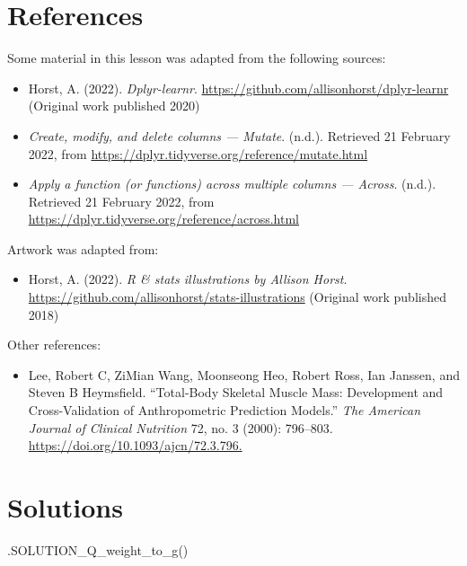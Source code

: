 \documentclass[
  letterpaper,
  DIV=11,
  numbers=noendperiod]{scrreprt}
\newenvironment{Shaded}{\begin{snugshade}}{\end{snugshade}}
\newcommand{\FunctionTok}[1]{\textcolor[rgb]{0.28,0.35,0.67}{#1}}
\newcommand{\NormalTok}[1]{\textcolor[rgb]{0.00,0.23,0.31}{#1}}
\providecommand{\tightlist}{%
  \setlength{\itemsep}{0pt}\setlength{\parskip}{0pt}}\usepackage{longtable,booktabs,array}
\begin{document}
\section*{References}\label{references-8}


Some material in this lesson was adapted from the following sources:

\begin{itemize}
\item
  Horst, A. (2022). \emph{Dplyr-learnr}.
  \url{https://github.com/allisonhorst/dplyr-learnr} (Original work
  published 2020)
\item
  \emph{Create, modify, and delete columns --- Mutate}. (n.d.).
  Retrieved 21 February 2022, from
  \url{https://dplyr.tidyverse.org/reference/mutate.html}
\item
  \emph{Apply a function (or functions) across multiple columns ---
  Across}. (n.d.). Retrieved 21 February 2022, from
  \url{https://dplyr.tidyverse.org/reference/across.html}
\end{itemize}

Artwork was adapted from:

\begin{itemize}
\tightlist
\item
  Horst, A. (2022). \emph{R \& stats illustrations by Allison Horst}.
  \url{https://github.com/allisonhorst/stats-illustrations} (Original
  work published 2018)
\end{itemize}

Other references:

\begin{itemize}
\tightlist
\item
  Lee, Robert C, ZiMian Wang, Moonseong Heo, Robert Ross, Ian Janssen,
  and Steven B Heymsfield. ``Total-Body Skeletal Muscle Mass:
  Development and Cross-Validation of Anthropometric Prediction
  Models.'' \emph{The American Journal of Clinical Nutrition} 72, no. 3
  (2000): 796--803. \url{https://doi.org/10.1093/ajcn/72.3.796.}
\end{itemize}

\section{Solutions}\label{solutions-3}

\begin{Shaded}
\begin{Highlighting}[]
\FunctionTok{.SOLUTION\_Q\_weight\_to\_g}\NormalTok{()}
\end{Highlighting}
\end{Shaded}
\end{document}
